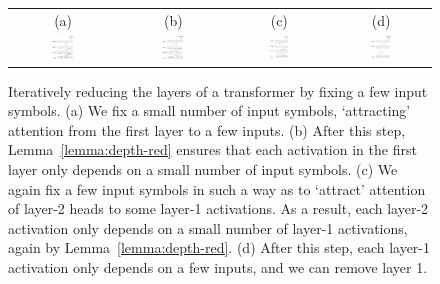 \documentclass[11pt,a4paper]{article}
\begin{document}






\begin{figure}[ht]
    \centering
    \begin{tabular}{cccc}
    (a) & (b) & (c) & (d) \\
    \includegraphics[width=0.23\textwidth]{figures/sa1_.png} &
        \includegraphics[width=0.23\textwidth]{figures/sa2_.png}&
    \includegraphics[width=0.22\textwidth]{figures/sa3_.png} &
        \includegraphics[width=0.23\textwidth]{figures/sa4_.png}
        \end{tabular}
	\caption{Iteratively reducing the layers of a transformer by fixing a few input symbols. (a) We fix a small number of input symbols, `attracting' attention from the first layer to a few inputs. (b) After this step, Lemma~\ref{lemma:depth-red} ensures that each activation in the first layer only depends on a small number of input symbols. (c) We again fix a few input symbols in such a way as to `attract' attention of layer-2 heads to some layer-1 activations. As a result, each layer-2 activation only depends on a small number of layer-1 activations, again by Lemma~\ref{lemma:depth-red}. (d) After this step, each layer-1 activation only depends on a few inputs, and we can remove layer 1. %
}
\end{figure}
\end{document}
